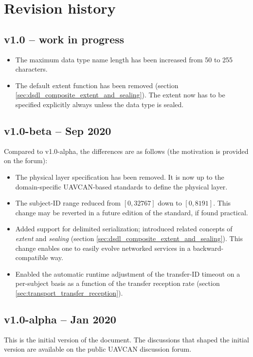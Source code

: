 \section{Revision history}

\subsection{v1.0 -- work in progress}

\begin{itemize}
    \item The maximum data type name length has been increased from 50 to 255 characters.

    \item The default extent function has been removed (section \ref{sec:dsdl_composite_extent_and_sealing}).
    The extent now has to be specified explicitly always unless the data type is sealed.
\end{itemize}

\subsection{v1.0-beta -- Sep 2020}

Compared to v1.0-alpha, the differences are as follows (the motivation is provided on the forum):

\begin{itemize}
    \item The physical layer specification has been removed.
    It is now up to the domain-specific UAVCAN-based standards to define the physical layer.

    \item The subject-ID range reduced from $[0, 32767]$ down to $[0, 8191]$.
    This change may be reverted in a future edition of the standard, if found practical.

    \item Added support for delimited serialization; introduced related concepts of \emph{extent} and \emph{sealing}
    (section \ref{sec:dsdl_composite_extent_and_sealing}).
    This change enables one to easily evolve networked services in a backward-compatible way.

    \item Enabled the automatic runtime adjustment of the transfer-ID timeout on a per-subject basis
    as a function of the transfer reception rate (section \ref{sec:transport_transfer_reception}).
\end{itemize}

\subsection{v1.0-alpha -- Jan 2020}

This is the initial version of the document.
The discussions that shaped the initial version are available on the public UAVCAN discussion forum.
